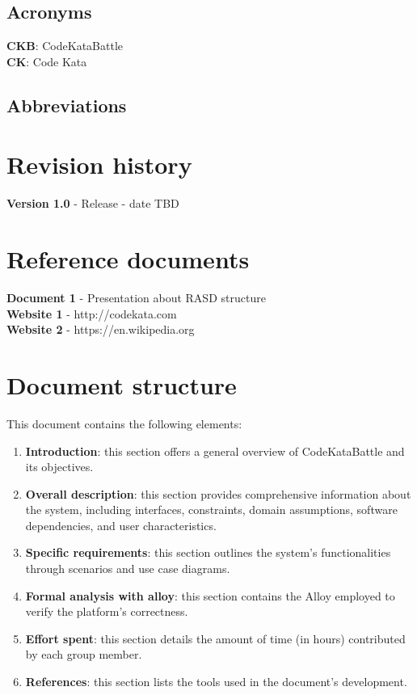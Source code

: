 \documentclass[12pt, a4paper]{report}
\begin{document}
    \subsection{Acronyms}
    \textbf{CKB}: CodeKataBattle 
    \\
    \textbf{CK}: Code Kata
    \subsection{Abbreviations}
    

    \section{Revision history}
    \textbf{Version 1.0} - Release - date TBD


    \section{Reference documents}
    \textbf{Document 1} - Presentation about RASD structure
    \\
    \textbf{Website 1} - http://codekata.com
    \\
    \textbf{Website 2} - https://en.wikipedia.org


    \section{Document structure}
    This document contains the following elements: 
    \begin{enumerate}
        \item \textbf{Introduction}: this section offers a general overview of CodeKataBattle and its objectives.
        \item \textbf{Overall description}: this section provides comprehensive information about the system, including interfaces, constraints, domain assumptions, 
            software dependencies, and user characteristics.
        \item \textbf{Specific requirements}: this section outlines the system's functionalities through scenarios and use case diagrams.
        \item \textbf{Formal analysis with alloy}: this section contains the Alloy employed to verify the platform's correctness.
        \item \textbf{Effort spent}: this section details the amount of time (in hours) contributed by each group member.
        \item \textbf{References}: this section lists the tools used in the document's development.
    \end{enumerate}
\end{document}
